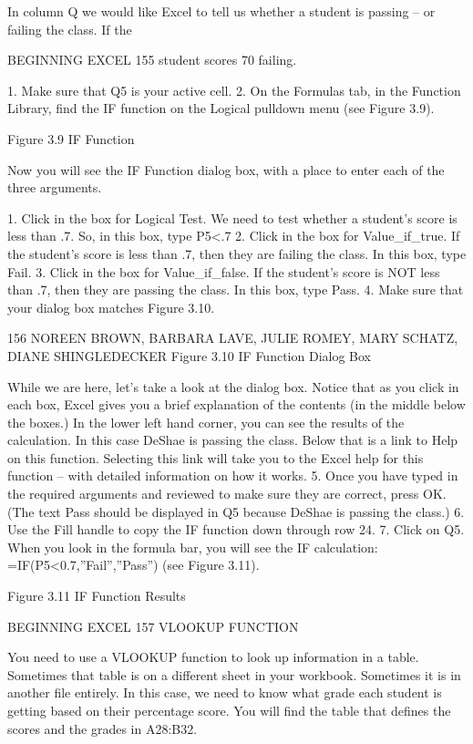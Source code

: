 In column Q we would like Excel to tell us whether a student is passing – or failing the class. If the

BEGINNING EXCEL 155
student scores 70%
failing.

1. Make sure that Q5 is your active cell.
2. On the Formulas tab, in the Function Library, find the IF function on the Logical pulldown
menu (see Figure 3.9).




Figure 3.9 IF Function


Now you will see the IF Function dialog box, with a place to enter each of the three arguments.

1. Click in the box for Logical Test. We need to test whether a student’s score is less than .7. So, in
this box, type P5<.7
2. Click in the box for Value_if_true. If the student’s score is less than .7, then they are failing the
class. In this box, type Fail.
3. Click in the box for Value_if_false. If the student’s score is NOT less than .7, then they are
passing the class. In this box, type Pass.
4. Make sure that your dialog box matches Figure 3.10.




156 NOREEN BROWN, BARBARA LAVE, JULIE ROMEY, MARY SCHATZ, DIANE SHINGLEDECKER
Figure 3.10 IF Function Dialog Box


While we are here, let’s take a look at the dialog box. Notice that as you click in each box, Excel
gives you a brief explanation of the contents (in the middle below the boxes.) In the lower left
hand corner, you can see the results of the calculation. In this case DeShae is passing the class.
Below that is a link to Help on this function. Selecting this link will take you to the Excel help
for this function – with detailed information on how it works.
5. Once you have typed in the required arguments and reviewed to make sure they are correct,
press OK. (The text Pass should be displayed in Q5 because DeShae is passing the class.)
6. Use the Fill handle to copy the IF function down through row 24.
7. Click on Q5. When you look in the formula bar, you will see the IF calculation:
=IF(P5<0.7,”Fail”,”Pass”) (see Figure 3.11).




Figure 3.11 IF Function Results

BEGINNING EXCEL 157
VLOOKUP FUNCTION

You need to use a VLOOKUP function to look up information in a table. Sometimes that table is on
a different sheet in your workbook. Sometimes it is in another file entirely. In this case, we need to
know what grade each student is getting based on their percentage score. You will find the table that
defines the scores and the grades in A28:B32.

